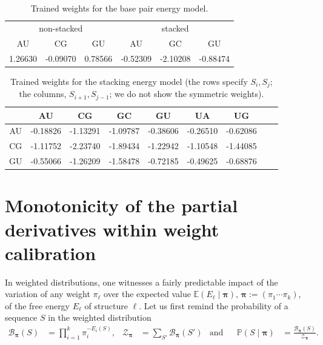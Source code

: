 \documentclass{bioinfo}
\newcommand{\partfun}[1]{\mathcal{Z}_{#1}}
\begin{document}
\begin{table}[b]
  \centering
  \caption{Trained weights for the base pair energy model.}
  \label{tab:basepairmodel}
  \begin{tabular}{c@{\quad}c@{\quad}c@{\quad}|@{\quad}c@{\quad}c@{\quad}c}
    \multicolumn{3}{c}{non-stacked} & \multicolumn{3}{c}{stacked}\\
    AU      & CG       & GU      & AU       & GC       & GU \\\hline
    1.26630 & -0.09070 & 0.78566 & -0.52309 & -2.10208 & -0.88474
  \end{tabular}
\end{table}


\begin{table}[b]
  \centering
  \caption{Trained weights for the stacking energy model (the rows specify $S_i,S_j$; the columns, $S_{i+1},S_{j-1}$; we do not show the symmetric weights).}
  \label{tab:stackingmodel}
  \begin{tabular}{c@{\quad}|@{\quad}c@{\quad}c@{\quad}c@{\quad}c@{\quad}c@{\quad}c@{\quad}c@{\quad}c}
       & AU & CG & GC & GU & UA & UG \\\hline
    AU &
-0.18826 &
-1.13291 &
-1.09787 &
-0.38606 &
-0.26510 &
-0.62086
    \\
    CG &
-1.11752 &
-2.23740 &
-1.89434 &
-1.22942 &
-1.10548 &
-1.44085
    \\
    GU &
-0.55066 &
-1.26209 &
-1.58478 &
-0.72185 &
-0.49625 &
-0.68876
    \\
  \end{tabular}
\end{table}

\section{Monotonicity of the partial derivatives within weight calibration}
\label{sec:weight_derivatives}
%
In weighted distributions, one witnesses a fairly predictable impact of the variation of any weight $\pi_\ell$ over the expected value $\mathbb{E}(E_\ell\mid \pmb{\pi})$, $\pmb{\pi}:= (\pi_1\cdots\pi_k)$, of the free energy $E_\ell$ of structure $\ell$.  Let us  first remind the probability of a sequence $S$ in the weighted distribution
\begin{align*}
  \mathcal{B}_{\pmb{\pi}}(S) &= \prod_{i=1}^{k} \pi_i^{-E_i(S)}, &
  \partfun{\pmb{\pi}}&=\sum_{S'}\mathcal{B}_{\pmb{\pi}}(S') &
    \text{and}& &
  \mathbb{P}(S\mid \pmb{\pi}) &= \frac{\mathcal{B}_{\pmb{\pi}}(S)}{\partfun{\pmb{\pi}}}.
  \end{align*}
\end{document}
